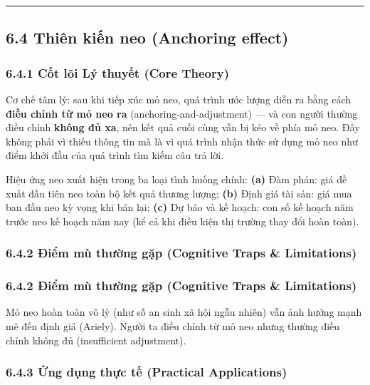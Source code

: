 \documentclass[
]{article}
\begin{document}
\begin{center}\rule{0.5\linewidth}{0.5pt}\end{center}

\subsection{6.4 Thiên kiến neo (Anchoring
effect)}\label{thiuxean-kiux1ebfn-neo-anchoring-effect}

\subsubsection{6.4.1 Cốt lõi Lý thuyết (Core
Theory)}\label{cux1ed1t-luxf5i-luxfd-thuyux1ebft-core-theory-11}

Cơ chế tâm lý: sau khi tiếp xúc mỏ neo, quá trình ước lượng diễn ra bằng
cách \textbf{điều chỉnh từ mỏ neo ra} (anchoring-and-adjustment) --- và
con người thường điều chỉnh \textbf{không đủ xa}, nên kết quả cuối cùng
vẫn bị kéo về phía mỏ neo. Đây không phải vì thiếu thông tin mà là vì
quá trình nhận thức sử dụng mỏ neo như điểm khởi đầu của quá trình tìm
kiếm câu trả lời.

Hiệu ứng neo xuất hiện trong ba loại tình huống chính: \textbf{(a)} Đàm
phán: giá đề xuất đầu tiên neo toàn bộ kết quả thương lượng;
\textbf{(b)} Định giá tài sản: giá mua ban đầu neo kỳ vọng khi bán lại;
\textbf{(c)} Dự báo và kế hoạch: con số kế hoạch năm trước neo kế hoạch
năm nay (kể cả khi điều kiện thị trường thay đổi hoàn toàn).

\subsubsection{6.4.2 Điểm mù thường gặp (Cognitive Traps \&
Limitations)}\label{ux111iux1ec3m-muxf9-thux1b0ux1eddng-gux1eb7p-cognitive-traps-limitations-21}

\subsubsection{6.4.2 Điểm mù thường gặp (Cognitive Traps \&
Limitations)}\label{ux111iux1ec3m-muxf9-thux1b0ux1eddng-gux1eb7p-cognitive-traps-limitations-22}

Mỏ neo hoàn toàn vô lý (như số an sinh xã hội ngẫu nhiên) vẫn ảnh hưởng
mạnh mẽ đến định giá (Ariely). Người ta điều chỉnh từ mỏ neo nhưng
thường điều chỉnh không đủ (insufficient adjustment).

\subsubsection{6.4.3 Ứng dụng thực tế (Practical
Applications)}\label{ux1ee9ng-dux1ee5ng-thux1ef1c-tux1ebf-practical-applications-12}
\end{document}
